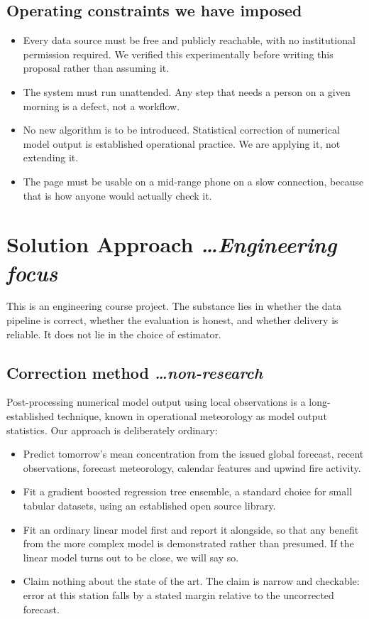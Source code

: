 \documentclass[11pt,a4paper]{article}
\newcommand{\BvrHint}[1]{%
  {\normalfont\normalsize\itshape\hfill #1}}
\begin{document}
\subsection{Operating constraints we have imposed}
\begin{itemize}[leftmargin=0.7cm]
  \item Every data source must be free and publicly
    reachable, with no institutional permission
    required. We verified this experimentally before
    writing this proposal rather than assuming it.
  \item The system must run unattended. Any step that
    needs a person on a given morning is a defect, not a
    workflow.
  \item No new algorithm is to be introduced.
    Statistical correction of numerical model output is
    established operational practice. We are applying
    it, not extending it.
  \item The page must be usable on a mid-range phone on
    a slow connection, because that is how anyone would
    actually check it.
\end{itemize}

\section{Solution Approach %
\BvrHint{\ldots Engineering focus}}
This is an engineering course project. The substance
lies in whether the data pipeline is correct, whether
the evaluation is honest, and whether delivery is
reliable. It does not lie in the choice of estimator.

\subsection{Correction method %
\BvrHint{\ldots non-research}}
Post-processing numerical model output using local
observations is a long-established technique, known in
operational meteorology as model output statistics. Our
approach is deliberately ordinary:

\begin{itemize}[leftmargin=0.7cm]
  \item Predict tomorrow's mean concentration from the
    issued global forecast, recent observations,
    forecast meteorology, calendar features and upwind
    fire activity.
  \item Fit a gradient boosted regression tree ensemble,
    a standard choice for small tabular datasets, using
    an established open source library.
  \item Fit an ordinary linear model first and report it
    alongside, so that any benefit from the more complex
    model is demonstrated rather than presumed. If the
    linear model turns out to be close, we will say so.
  \item Claim nothing about the state of the art. The
    claim is narrow and checkable: error at this station
    falls by a stated margin relative to the uncorrected
    forecast.
\end{itemize}
\end{document}
